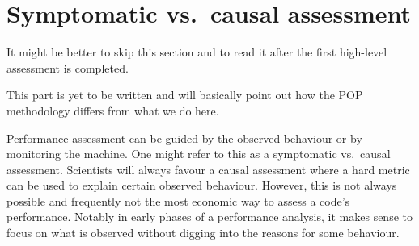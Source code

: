 \section{Symptomatic vs.~causal assessment}
\label{section:related-work:symptoms}


\begin{readerguide}
 It might be better to skip this section and to read it after the first
 high-level assessment is completed.
\end{readerguide}

\begin{wip}
 This part is yet to be written and will basically point out how the POP methodology differs from what we do here.
\end{wip}


Performance assessment can be guided by the observed behaviour or by monitoring the machine.
One might refer to this as a symptomatic vs.~causal assessment. 
Scientists will always favour a causal assessment where a hard metric can be used to explain certain observed behaviour.
However, this is not always possible and frequently not the most economic way to assess a code's performance.
Notably in early phases of a performance analysis, it makes sense to focus on what is observed without digging into the reasons for some behaviour.
